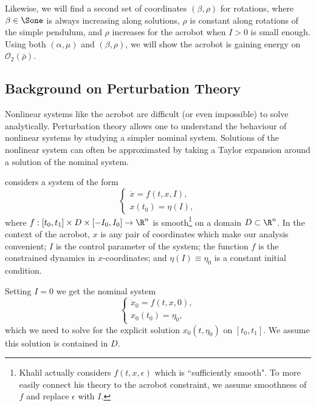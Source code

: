 Likewise, we will find a second set of coordinates \((\beta, \rho)\) for
rotations, where \(\beta \in \Sone\) is always increasing along solutions,
\(\rho\) is constant along rotations of the simple pendulum, and \(\rho\)
increases for the acrobot when \(I > 0\) is small enough.
Using both \((\alpha,\mu)\) and \((\beta,\rho)\), we will show the acrobot is
gaining energy on \(\mathcal{O}_2(\bar{\rho})\).

\subsection{Background on Perturbation Theory}
Nonlinear systems like the acrobot are difficult (or even impossible) to solve
analytically.
Perturbation theory allows one to understand the behaviour of nonlinear systems
by studying a simpler nominal system. 
Solutions of the nonlinear system can often be approximated by taking a Taylor
expansion around a solution of the nominal system.

\citet{khalil_nonlinear} considers a system of the form
\begin{equation}\label{eqn:khalil-setup}
    \begin{cases}
        \dot{x} = f(t,x,I), \\
        x(t_0) = \eta(I),
    \end{cases}
\end{equation}
where 
\(f : [t_0,t_1] \times D \times [-I_0,I_0] \rightarrow \R^n\) is  
smooth\footnote{Khalil actually considers \(f(t,x,\epsilon)\) which is ``sufficiently
    smooth". To more easily connect his theory to the acrobot constraint, we
    assume smoothness of \(f\) and replace \(\epsilon\) with \(I\).}
on a domain \(D \subset \R^n\).
In the context of the acrobot, \(x\) is any pair of coordinates which make
our analysis convenient;
\(I\) is the control parameter of the system;
the function \(f\) is the constrained dynamics in \(x\)-coordinates;
and \(\eta(I) \equiv \eta_0\) is a constant initial condition.

Setting \(I = 0\) we get the nominal system
\begin{equation}\label{eqn:khalil-perturbation-nominal}
    \begin{cases}
        \dot{x}_0 = f(t,x,0) ,\\
        x_0(t_0) = \eta_0 ,
    \end{cases}
\end{equation}
which we need to solve for the explicit solution \(x_0(t,\eta_0)\) on
\([t_0,t_1]\).
We assume this solution is contained in \(D\).

